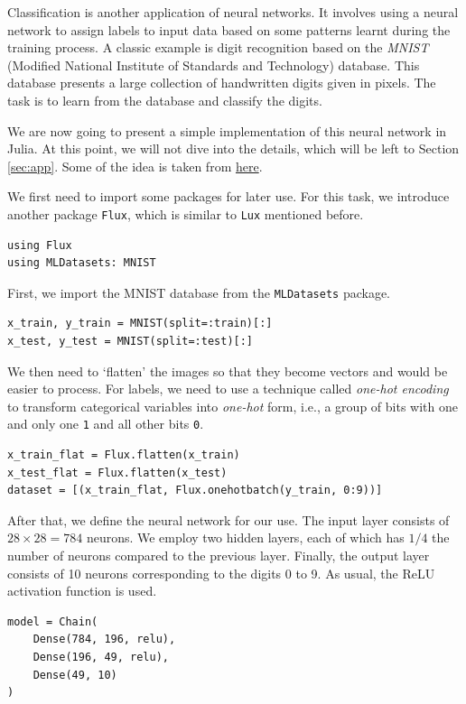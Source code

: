 \documentclass[a4paper,11pt,titlepage]{article}
\theoremstyle{definition}
\theoremstyle{plain}
\theoremstyle{remark}
\begin{document}
Classification is another application of neural networks. It involves using a neural network to assign labels to input data based on some patterns learnt during the training process. A classic example is digit recognition based on the \textit{MNIST} (Modified National Institute of Standards and Technology) database. This database presents a large collection of handwritten digits given in pixels. The task is to learn from the database and classify the digits.

We are now going to present a simple implementation of this neural network in Julia. At this point, we will not dive into the details, which will be left to Section \ref{sec:app}. Some of the idea is taken from \href{https://github.com/piotrek124-1/Simple_MNIST_Julia/tree/main}{here}.

We first need to import some packages for later use. For this task, we introduce another package \verb|Flux|, which is similar to \verb|Lux| mentioned before. 

\begin{verbatim}
using Flux
using MLDatasets: MNIST
\end{verbatim}

First, we import the MNIST database from the \verb|MLDatasets| package.

\begin{verbatim}
x_train, y_train = MNIST(split=:train)[:]
x_test, y_test = MNIST(split=:test)[:]
\end{verbatim}

We then need to ‘flatten’ the images so that they become vectors and would be easier to process. For labels, we need to use a technique called \textit{one-hot encoding} to transform categorical variables into \textit{one-hot} form, i.e., a group of bits with one and only one \verb|1| and all other bits \verb|0|.

\begin{verbatim}
x_train_flat = Flux.flatten(x_train)
x_test_flat = Flux.flatten(x_test)
dataset = [(x_train_flat, Flux.onehotbatch(y_train, 0:9))]
\end{verbatim}

After that, we define the neural network for our use. The input layer consists of $28\times 28 = 784$ neurons. We employ two hidden layers, each of which has $1/4$ the number of neurons compared to the previous layer. Finally, the output layer consists of 10 neurons corresponding to the digits 0 to 9. As usual, the ReLU activation function is used.

\begin{verbatim}
model = Chain(
    Dense(784, 196, relu),
    Dense(196, 49, relu),
    Dense(49, 10)
)
\end{verbatim}
\end{document}
